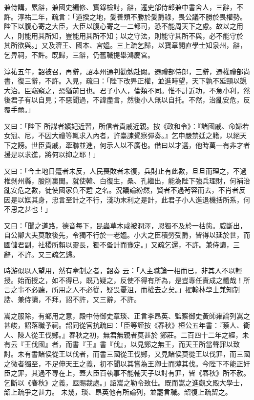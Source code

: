 \begin{pinyinscope}
 兼侍講，累辭，兼國史編修、實錄檢討，辭，遷吏部侍郎兼中書舍人，三辭，不許。淳祐二年，疏言：「道揆之地，愛善類不勝於愛爵祿，畏公議不勝於畏權勢。陛下以腹心寄之大臣，大臣以腹心寄之一二都司，恐不能周天下之慮。故以之用人，則能用其所知，豈能用其所不知；以之守法，則能守其所不與，必不能守於
 其所欲與。」又及濟王、國本、宮媼。三上疏乞歸，以寶章閣直學士知泉州，辭，乞畀祠，不許。既歸，三辭，仍舊職提舉鴻慶宮。



 淳祐五年，韶被召，再辭，詔本州通判勸勉赴闕。遷禮部侍郎，三辭，遷權禮部尚書，復三辭，不許。入見，疏曰：「陛下改畀正權，並進時望，天下孰不延頸以覬大治。臣竊窺之，恐猶前日也。君子小人，倫類不同。惟不計近功，不急小利，然後君子有以自見；不惡聞過，不諱盡言，然後小人無以自托。不然，治亂安危，反覆手爾。」



 又曰：「陛下
 所謀者嬪妃近習，所信者貴戚近親。按《政和令》：『諸國戚、命婦若女冠、尼，不因大禮等輒求入內者，許臺諫覺察彈奏。』乞申嚴禁廷之籍，以絕天下之謗。世臣貴戚，牽聯並進，何示人以不廣也。借曰以才選，他時萬一有非才者援是以求進，將何以抑之耶！」



 又曰：「今土地日蹙者未反，人民喪敗者未復，兵財止有此數，旦旦而理之，不過椎剝州縣，朘削裏閭。就使韓、白復生，桑、孔繼出，能為陛下強兵理財，何補治亂安危之數，徒使國家負不韙
 之名。況議論紛然，賢者不過茍容而去，不肖者反因是以媒其身，忠言至計之不行，淺功末利之是計，此君子小人進退機括所系，何不思之甚也！」



 又曰：「聞之道路，德音每下，昆蟲草木咸被潤澤，恩獨不及於一枯胔。威斷出，自公卿大夫莫敢後先，令獨不行於一老媼。小大之臣積勞受爵，皆得以延於世，而國儲君副，社稷所賴以靈長，獨不蚤計而豫定。」又疏乞還，不許。兼侍讀，三辭，不許。又三疏乞歸。



 時游似以人望用，然有牽制之者，韶奏
 云：「人主職論一相而已，非其人不以輕授。始而授之，如不得已，既乃疑之，反使不得有所為，是豈專任責成之體哉！所言之事不必聽，所用之人不必從，疑畏憂沮，而權去之矣。」擢翰林學士兼知制誥、兼侍讀，不拜，詔不許，又三辭，不許。



 嵩之服除，有鄉用之意，殿中侍御史章琰、正言李昂英、監察御史黃師雍論列嵩之甚峻，詔落職予祠。韶同從官抗疏曰：「臣等謹按《春秋》桓公五年書：『蔡人、衛人、陳人從王伐鄭。』春秋之初，無君無親者莫甚於
 鄭莊。二百四十二年之經，未有云『王伐國』者，而書『王』書『伐』，以見鄭之無王，而天王所當聲罪以致討。未有書諸侯從王以伐者，而書三國從王伐鄭，又見諸侯莫從王以伐罪，而三國之微者獨至，不足伸天王之義，初不聞以其嘗為王卿士而薄其伐。今陛下不能正奸臣之罪，其過不專在上，蓋大臣百執事不能輔天子以討有罪，皆《春秋》所不赦。乞斷以《春秋》之義，亟賜裁處。」詔嵩之勒令致仕。既而嵩之進觀文殿大學士，韶上疏爭之甚力。
 未幾，琰、昂英他有所論列，並罷言職。韶復上疏留之。




\end{pinyinscope}
